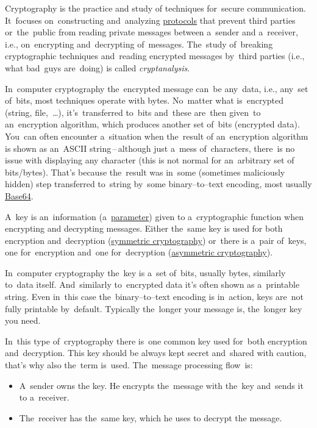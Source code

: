\label{cryptography}
Cryptography is the practice and study of techniques for~secure communication.
It~focuses on~constructing and~analyzing \hyperref[protocolstandard]{protocols} that prevent third parties or~the~public from reading private messages between a~sender and a~receiver, i.e., on~encrypting and~decrypting of~messages.
The~study of~breaking cryptographic techniques and~reading encrypted messages by~third parties (i.e., what bad~guys are~doing) is called \textit{cryptanalysis}.

In~computer cryptography the~encrypted message can~be any~data, i.e., any~set of~bits, most techniques operate with bytes.
No~matter what is~encrypted (string, file,~\dots), it's~transferred to~bits and~these are~then given~to an~encryption algorithm, which produces another set of~bits (encrypted data).
You~can often encounter a~situation when the~result of an~encryption algorithm is shown as an~ASCII string\,--\,although just a~mess of~characters, there~is no issue with displaying any character (this is not normal for an~arbitrary set of bits/bytes).
That's because the~result was in~some (sometimes maliciously hidden) step transferred to~string by~some binary--to--text encoding, most usually \hyperref[base64]{Base64}.

A~key is an~information (a~\hyperref[parameterargument]{parameter}) given to a~cryptographic function when encrypting and decrypting messages.
Either the~same key is used for both encryption and~decryption (\hyperref[symmetriccryptography]{symmetric cryptography}) or~there is a~pair of~keys, one for~encryption and~one for~decryption (\hyperref[asymmetriccryptography]{asymmetric cryptography}).

In~computer cryptography the~key is a~set of~bits, usually bytes, similarly to~data itself.
And~similarly to~encrypted data it's often shown as a~printable string.
Even in~this case the~binary--to--text encoding is in~action, keys are~not fully printable by~default.
Typically the~longer your message is, the~longer key you need.
\newpage

\label{symmetriccryptography}
In~this type of~cryptography there is~one common key used for~both encryption and~decryption.
This key should be always kept secret and~shared with caution, that's why also the~term  is~used.
The~message processing flow~is:
\begin{itemize}
    \item A~sender owns the key.
          He encrypts the~message with the~key and~sends it to a~receiver.
    \item The~receiver has the~same key, which he uses to decrypt the message.
\end{itemize}

